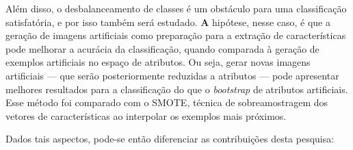 Além disso, o desbalanceamento de classes é um obstáculo para uma classificação satisfatória, e por isso também será estudado. {\textbf A hipótese, nesse caso, é que a geração de imagens artificiais como preparação para a extração de características pode melhorar a acurácia da classificação, quando comparada à geração de exemplos artificiais no espaço de atributos.} Ou seja, gerar novas imagens artificiais — que serão posteriormente reduzidas a atributos — pode apresentar melhores resultados para a classificação do que o \textit{bootstrap} de atributos artificiais. Esse método foi comparado com o SMOTE, técnica de sobreamostragem dos vetores de características ao interpolar os exemplos mais próximos.

Dados tais aspectos, pode-se então diferenciar as contribuições desta pesquisa:

